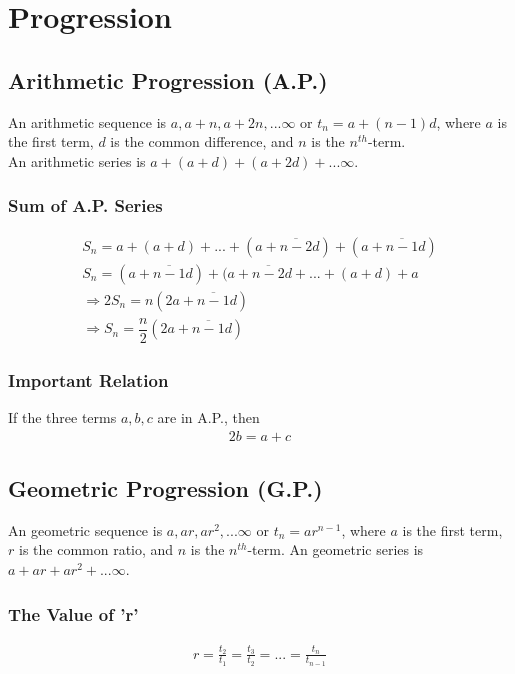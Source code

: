 \documentclass[../main.tex]{subfiles}
\begin{document}
	\chapter{Progression}
	
	\section{Arithmetic Progression (A.P.)}
	An arithmetic sequence is $a,a+n,a+2n,...\infty$ or $t_n = a+(n-1)d$, where $a$ is the first term, $d$ is the common difference, and $n$ is the $n^{th}$-term.\\
	An arithmetic series is $a+(a+d)+(a+2d)+...\infty$.
	\subsection{Sum of A.P. Series}
	\begin{align}
		S_n=a+(a+d)+...+(a+\overline{n-2}d)+(a+\overline{n-1}d)\nonumber\\
		S_n=(a+\overline{n-1}d)+(a+\overline{n-2}d+...+(a+d)+ a\nonumber\\
		\Rightarrow 2S_n=n(2a+\overline{n-1}d)\nonumber\\
		\Rightarrow S_n=\dfrac{n}{2}(2a+\overline{n-1}d)
	\end{align}

	\subsection{Important Relation}
	If the three terms $a,b,c$ are in A.P., then
	\begin{align}
		2b=a+c
	\end{align}
	
	
	\section{Geometric Progression (G.P.)}
	An geometric sequence is $a,ar,ar^2,...\infty$ or $t_n=ar^{n-1}$, where $a$ is the first term, $r$ is the common ratio, and $n$ is the $n^{th}$-term.
	An geometric series is $a+ar+ar^2+...\infty$.
	\subsection{The Value of 'r'}
	\begin{align}
		r=\frac{t_2}{t_1}=\frac{t_3}{t_2}=...=\frac{t_{n}}{t_{n-1}}
	\end{align}
	
\end{document}
